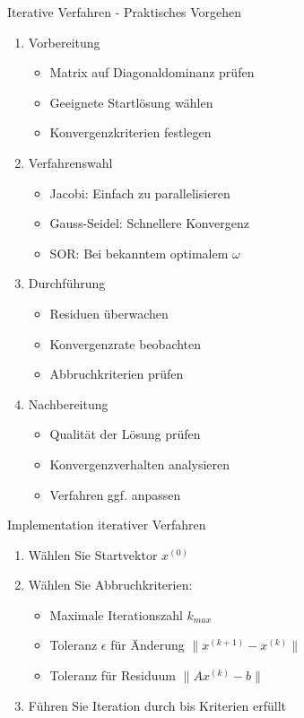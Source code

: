 \begin{KR}{Iterative Verfahren - Praktisches Vorgehen}
\begin{enumerate}
    \item Vorbereitung
    \begin{itemize}
        \item Matrix auf Diagonaldominanz prüfen
        \item Geeignete Startlösung wählen
        \item Konvergenzkriterien festlegen
    \end{itemize}
    
    \item Verfahrenswahl
    \begin{itemize}
        \item Jacobi: Einfach zu parallelisieren
        \item Gauss-Seidel: Schnellere Konvergenz
        \item SOR: Bei bekanntem optimalem $\omega$
    \end{itemize}
    
    \item Durchführung
    \begin{itemize}
        \item Residuen überwachen
        \item Konvergenzrate beobachten
        \item Abbruchkriterien prüfen
    \end{itemize}
    
    \item Nachbereitung
    \begin{itemize}
        \item Qualität der Lösung prüfen
        \item Konvergenzverhalten analysieren
        \item Verfahren ggf. anpassen
    \end{itemize}
\end{enumerate}
\end{KR}

\begin{KR}{Implementation iterativer Verfahren}
\begin{enumerate}
    \item Wählen Sie Startvektor $x^{(0)}$
    \item Wählen Sie Abbruchkriterien:
        \begin{itemize}
            \item Maximale Iterationszahl $k_{max}$
            \item Toleranz $\epsilon$ für Änderung $\|x^{(k+1)} - x^{(k)}\|$
            \item Toleranz für Residuum $\|Ax^{(k)} - b\|$
        \end{itemize}
    \item Führen Sie Iteration durch bis Kriterien erfüllt
\end{enumerate}
\end{KR}

